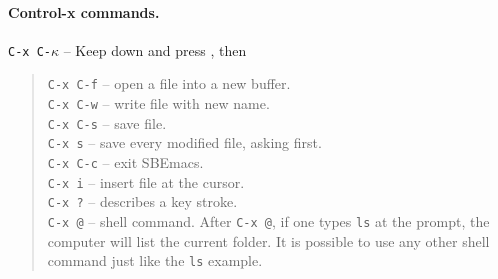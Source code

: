 \documentclass[a4paper,12pt,openany]{book}
\begin{document}
\paragraph{Control-x commands.} \verb|C-x C-|$\kappa$ -- Keep 
down and press , then \keys{$\kappa$}
\begin{quote}
  \verb|C-x C-f| -- open a file into a new buffer.\\
  \verb|C-x C-w| -- write file with new name.\\
\verb|C-x C-s| -- save file.\\
\verb|C-x s| -- save every modified file, asking first.\\
\verb|C-x C-c| -- exit SBEmacs.\\
\verb|C-x i| -- insert file at the cursor.\\
\verb|C-x ?| -- describes a key stroke.\\
\verb|C-x @| --  shell command. After \verb|C-x @|,
if one types \verb|ls| at the prompt, the computer
will list the current folder.
It is possible to use any other shell command
just like the \verb|ls| example.
\end{quote}
\end{document}
